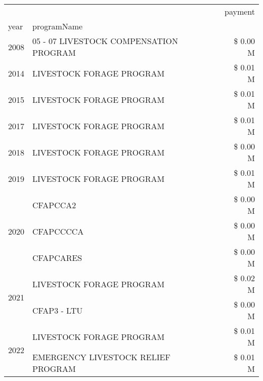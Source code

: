 \begin{tabular}{llr}
\toprule
 &  & payment \\
year & programName &  \\
\midrule
2008 & 05 - 07 LIVESTOCK COMPENSATION PROGRAM & \$ 0.00 M \\
\cline{1-3}
2014 & LIVESTOCK FORAGE PROGRAM & \$ 0.01 M \\
\cline{1-3}
2015 & LIVESTOCK FORAGE PROGRAM & \$ 0.01 M \\
\cline{1-3}
2017 & LIVESTOCK FORAGE PROGRAM & \$ 0.01 M \\
\cline{1-3}
2018 & LIVESTOCK FORAGE PROGRAM & \$ 0.00 M \\
\cline{1-3}
2019 & LIVESTOCK FORAGE PROGRAM & \$ 0.01 M \\
\cline{1-3}
\multirow[t]{3}{*}{2020} & CFAPCCA2 & \$ 0.00 M \\
 & CFAPCCCCA & \$ 0.00 M \\
 & CFAPCARES & \$ 0.00 M \\
\cline{1-3}
\multirow[t]{2}{*}{2021} & LIVESTOCK FORAGE PROGRAM & \$ 0.02 M \\
 & CFAP3 - LTU & \$ 0.00 M \\
\cline{1-3}
\multirow[t]{2}{*}{2022} & LIVESTOCK FORAGE PROGRAM & \$ 0.01 M \\
 & EMERGENCY LIVESTOCK RELIEF PROGRAM & \$ 0.01 M \\
\cline{1-3}
\bottomrule
\end{tabular}
